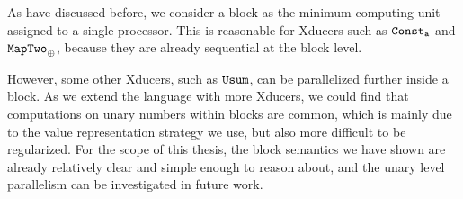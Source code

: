 %	
%	
%	
%	
%	
%	
%	
%	
%
%



As have discussed before, we consider a block  as the minimum computing unit assigned to a single processor. This is reasonable for
Xducers such as $\mathtt{Const_{a}}$ and $\mathtt{MapTwo}_{\oplus}$, because
they are already sequential at the block level. 

However, some other Xducers, such as $\mathtt{Usum}$, can be parallelized further inside a block.
As we extend the language with more Xducers, we could find that computations on unary numbers within blocks are common, which is mainly due to the value representation strategy we use, but also more difficult to be regularized.
For the scope of this thesis, the block semantics we have shown are already relatively clear and simple enough to reason about, and the unary level parallelism can be investigated in future work. 



